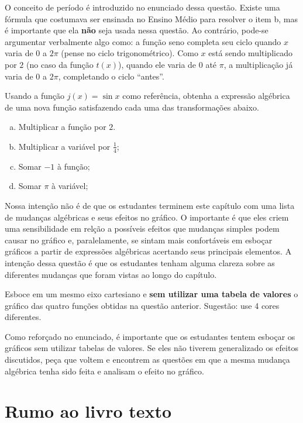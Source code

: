 \documentclass[main_estudante.tex]{subfiles}
\begin{document}
O conceito de período é introduzido no enunciado dessa questão. Existe uma fórmula que costumava ser ensinada no Ensino Médio para resolver o item b, mas é importante que ela \textbf{não} seja usada nessa questão. Ao contrário, pode-se argumentar verbalmente algo como: a função seno completa seu ciclo quando $x$ varia de $0$ a $2\pi$ (pense no ciclo trigonométrico). Como $x$ está sendo multiplicado por $2$ (no caso da função $t(x)$), quando ele varia de $0$ até $\pi$, a multiplicação já varia de $0$ a $2\pi$, completando o ciclo ``antes''.

\begin{questao}
Usando a função $j(x)=\sin{x}$ como referência, obtenha a expressão algébrica de uma nova função satisfazendo cada uma das transformações abaixo.
\begin{enumerate}[a)]
\item Multiplicar a função por $2$.
\item Multiplicar a variável por $\frac{1}{4}$;
\item Somar $-1$ à função;
\item Somar $\pi$ à variável;
\end{enumerate}
\end{questao}

Nossa intenção não é de que os estudantes terminem este capítulo com uma lista de mudanças algébricas e seus efeitos no gráfico. O importante é que eles criem uma sensibilidade em relção a possíveis efeitos que mudanças simples podem causar no gráfico e, paralelamente, se sintam mais confortáveis em esboçar gráficos a partir de expressões algébricas acertando seus principais elementos. A intenção dessa questão é que os estudantes tenham alguma clareza sobre as diferentes mudanças que foram vistas ao longo do capítulo.

\begin{questao}
Esboce em um mesmo eixo cartesiano e \textbf{sem utilizar uma tabela de valores} o gráfico das quatro funções obtidas na questão anterior. Sugestão: use 4 cores diferentes.
\end{questao}

Como reforçado no enunciado, é importante que os estudantes tentem esboçar os gráficos sem utilizar tabelas de valores. Se eles não tiverem generalizado os efeitos discutidos, peça que voltem e encontrem as questões em que a mesma mudança algébrica tenha sido feita e analisam o efeito no gráfico.

\section{Rumo ao livro texto}
\end{document}
